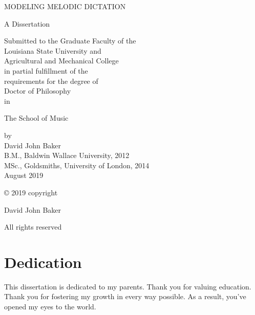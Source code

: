 \thispagestyle{empty}
\begin{center}
MODELING MELODIC DICTATION\\
\end{center}

\begin{center}
A Dissertation

Submitted to the Graduate Faculty of the\\
Louisiana State University and\\
Agricultural and Mechanical College\\
in partial fulfillment of the\\
requirements for the degree of\\
Doctor of Philosophy\\

in

The School of Music
\end{center}

\begin{center}
by\\
David John Baker\\
B.M., Baldwin Wallace University, 2012\\
MSc., Goldsmiths, University of London, 2014\\
August 2019\\
\end{center}


\setlength{\abovedisplayskip}{-5pt}
\setlength{\abovedisplayshortskip}{-5pt}


\newpage

\thispagestyle{plain}

© 2019 copyright

David John Baker

All rights reserved


\let\cleardoublepage\clearpage
\pagestyle{empty}
\chapter{Dedication}

This dissertation is dedicated to my parents.
Thank you for valuing education.
Thank you for fostering my growth in every way possible.
As a result, you've opened my eyes to the world.


